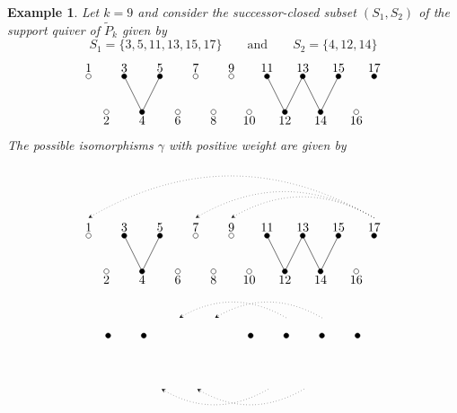 \documentclass{amsart}
\newtheorem{example}[theorem]{Example}
\numberwithin{equation}{section}
\begin{document}
    \begin{example}
      Let $k=9$ and consider the successor-closed subset $(S_1,S_2)$ of the support quiver of $\tilde P_k$ given by
      \[S_1=\{3,5,11,13,15,17\}\qquad\text{and}\qquad S_2=\{4,12,14\}\]
      \[
        \begin{tikzpicture}
          \foreach \i in {3,5,11,13,15,17}{
            \draw[fill=black] (0.5*\i,1) circle (2pt);
            \node[above] at (0.5*\i,1) {\i};} 
          \foreach \i in {1,7,9}{
            \draw[fill=white] (0.5*\i,1) circle (2pt);
            \node[above] at (0.5*\i,1) {\i};} 
          \foreach \i in {4,12,14}{
            \draw[fill=black] (0.5*\i,0) circle (2pt);
            \draw (0.5*\i,0) -- (0.5*\i-0.5,1);
            \draw (0.5*\i,0) -- (0.5*\i+0.5,1);
            \node[below] at (0.5*\i,0) {\i};} 
          \foreach \i in {2,6,8,10,16}{
            \draw[fill=white] (0.5*\i,0) circle (2pt);
            \node[below] at (0.5*\i,0) {\i};} 
        \end{tikzpicture}
      \]
      The possible isomorphisms $\gamma$ with positive weight are given by
      \[
        \begin{tikzpicture}
          \draw[dotted,-stealth] (8.5,1.5) to[out=150,in=30] (0.5,1.5);
          \draw[dotted,-stealth] (8.5,1.5) to[out=150,in=30] (3.5,1.5);
          \draw[dotted,-stealth] (8.5,1.5) to[out=150,in=30] (4.5,1.5);
          \foreach \i in {3,5,11,13,15,17}{
            \draw[fill=black] (0.5*\i,1) circle (2pt);
            \node[above] at (0.5*\i,1) {\i};} 
          \foreach \i in {1,7,9}{
            \draw[fill=white] (0.5*\i,1) circle (2pt);
            \node[above] at (0.5*\i,1) {\i};} 
          \foreach \i in {4,12,14}{
            \draw[fill=black] (0.5*\i,0) circle (2pt);
            \draw (0.5*\i,0) -- (0.5*\i-0.5,1);
            \draw (0.5*\i,0) -- (0.5*\i+0.5,1);
            \node[below] at (0.5*\i,0) {\i};} 
          \foreach \i in {2,6,8,10,16}{
            \draw[fill=white] (0.5*\i,0) circle (2pt);
            \node[below] at (0.5*\i,0) {\i};} 
        \end{tikzpicture}
      \]
      \[
        \begin{tikzpicture}
          \draw[dotted,-stealth] (6.5,1.5) to[out=150,in=30] (3.5,1.5);
          \draw[dotted,-stealth] (7.5,1.5) to[out=150,in=30] (4.5,1.5);
          \draw[dotted,-stealth] (6,-0.5) to[out=210,in=-30] (3,-0.5);
          \draw[dotted,-stealth] (7,-0.5) to[out=210,in=-30] (4,-0.5);
          \foreach \i in {3,5,11,13,15,17}{
            \draw[fill=black] (0.5*\i,1) circle (2pt);
}
\end{tikzpicture}\]
\end{example}
\end{document}
